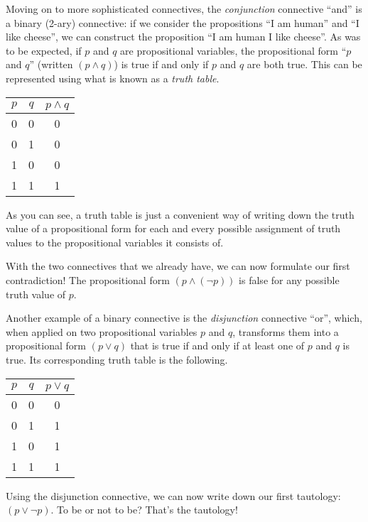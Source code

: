 \begin{para}
Moving on to more sophisticated connectives, the \emph{conjunction} connective ``and'' is a binary (2-ary) connective: if we consider the propositions ``I am human'' and ``I like cheese'', we can construct the proposition ``I am human  I like cheese''.
As was to be expected, if $p$ and $q$ are propositional variables, the propositional form ``$p$ and $q$'' (written $(p\land q)$) is true if and only if $p$ and $q$ are both true. This can be represented using what is known as a \emph{truth table}.
\begin{center}
\begin{tabular}[]{|c|c||c|}
\hline $p$ & $q$ & $p\land q$ \\
\hline\hline 0 & 0 & 0 \\
\hline 0 & 1 & 0 \\
\hline 1 & 0 & 0 \\
\hline 1 & 1 & 1 \\
\hline
\end{tabular}
\end{center}
As you can see, a truth table is just a convenient way of writing down the truth value of a propositional form for each and every possible assignment of truth values to the propositional variables it consists of.

With the two connectives that we already have, we can now formulate our first contradiction! The propositional form $(p\land (\lnot p))$ is false for any possible truth value of $p$.

Another example of a binary connective is the \emph{disjunction} connective ``or'', which, when applied on two propositional variables $p$ and $q$, transforms them into a propositional form $(p\lor q)$ that is true if and only if at least one of $p$ and $q$ is true. Its corresponding truth table is the following.
\begin{center}
\begin{tabular}[]{|c|c||c|}
\hline $p$ & $q$ & $p\lor q$ \\
\hline\hline 0 & 0 & 0 \\
\hline 0 & 1 & 1 \\
\hline 1 & 0 & 1 \\
\hline 1 & 1 & 1 \\
\hline
\end{tabular}
\end{center}
Using the disjunction connective, we can now write down our first tautology: $(p\lor \lnot p)$. To be or not to be? That's the tautology!
\end{para}

